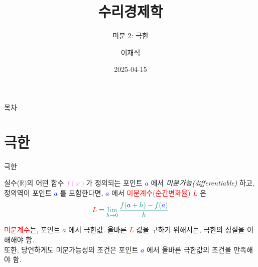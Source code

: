 \documentclass[aspectratio=169]{beamer}
\title{수리경제학}
\subtitle{미분 2: 극한}
\author{이재석}
\date{2025-04-15}
\begin{document}
\begin{frame}
  \titlepage
\end{frame}

\begin{frame}{목차}
  \tableofcontents
\end{frame}


\section{극한}

\begin{frame}{극한}
  \begin{definition}[도함수]
    실수($\mathbb{R}$)의 어떤 함수 \textcolor{violet}{$f(x)$}가 정의되는 포인트 \textcolor{blue}{\emph{$a$}} 에서 \emph{미분가능(differentiable)} 하고, 정의역이 포인트 \textcolor{blue}{\emph{$a$}} 를 포함한다면, \textcolor{blue}{\emph{$a$}} 에서 \textcolor{red}{미분계수(순간변화율)} \textcolor{red}{\emph{$L$}} 은 \\
    \begin{equation}
      \textcolor{red}{L} = \textcolor{teal}{\lim_{h \to 0} \frac{f(\textcolor{blue}{a}+h)-f(\textcolor{blue}{a})}{h}}
    \end{equation}
  \end{definition}
  \textcolor{red}{미분계수}는, 포인트 \textcolor{blue}{\emph{$a$}} 에서 극한값. 올바른 \textcolor{red}{$L$} 값을 구하기 위해서는, 극한의 성질을 이해해야 함. \\또한, 당연하게도 미분가능성의 조건은 포인트 \textcolor{blue}{\emph{$a$}} 에서 올바른 극한값의 조건을 만족해야 함.
\end{frame}
\end{document}
